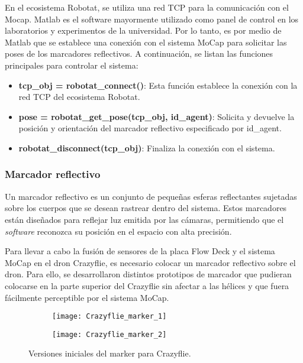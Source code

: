 En el ecosistema Robotat, se utiliza una red TCP para la comunicación con el Mocap. Matlab es el software mayormente utilizado como panel de control en los laboratorios y experimentos de la universidad. Por lo tanto, es por medio de Matlab que se establece una conexión con el sistema MoCap para solicitar las poses de los marcadores reflectivos. A continuación, se listan las funciones principales para controlar el sistema:

\begin{itemize}
	\item \textbf{tcp\_obj = robotat\_connect()}: Esta función establece la conexión con la red TCP del ecosistema Robotat.
	\item \textbf{pose = robotat\_get\_pose(tcp\_obj, id\_agent)}: Solicita y devuelve la posición y orientación del marcador reflectivo especificado por id\_agent.
	\item \textbf{robotat\_disconnect(tcp\_obj)}: Finaliza la conexión con el sistema.
\end{itemize}

\subsubsection{Marcador reflectivo}
Un marcador reflectivo es un conjunto de pequeñas esferas reflectantes sujetadas sobre los cuerpos que se desean rastrear dentro del sistema. Estos marcadores están diseñados para reflejar luz emitida por las cámaras, permitiendo que el \textit{software} reconozca su posición en el espacio con alta precisión.

Para llevar a cabo la fusión de sensores de la placa Flow Deck y el sistema MoCap en el dron Crazyflie, es necesario colocar un marcador reflectivo sobre el dron. Para ello, se desarrollaron distintos prototipos de marcador que pudieran colocarse en la parte superior del Crazyflie sin afectar a las hélices y que fuera fácilmente perceptible por el sistema MoCap.

\begin{figure}[htbp]
	\centering
	\begin{subfigure}[b]{0.35\textwidth}
		\centering
		\texttt{[image: Crazyflie\_marker\_1]}
	\end{subfigure}
	\hspace{0.01\textwidth} %
	\begin{subfigure}[b]{0.38\textwidth}
		\centering
		\texttt{[image: Crazyflie\_marker\_2]}
	\end{subfigure}
	\caption{Versiones iniciales del marker para Crazyflie.}
	\label{fig:Markers_primeras_versiones}
\end{figure}

